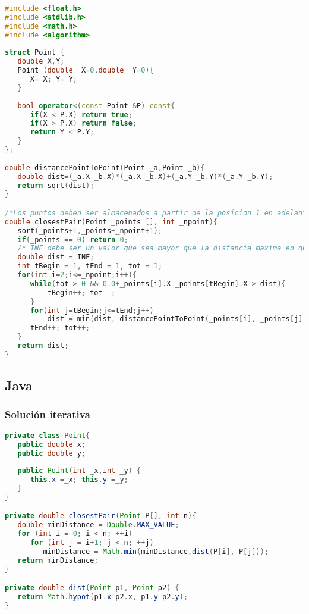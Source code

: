 \begin{lstlisting}[language=C++]
#include <float.h>
#include <stdlib.h>
#include <math.h>
#include <algorithm>
	
struct Point {
   double X,Y;
   Point (double _X=0,double _Y=0){
      X=_X; Y=_Y;
   }
		
   bool operator<(const Point &P) const{
      if(X < P.X) return true;
      if(X > P.X) return false;
      return Y < P.Y;
   }
};
	
double distancePointToPoint(Point _a,Point _b){
   double dist=(_a.X-_b.X)*(_a.X-_b.X)+(_a.Y-_b.Y)*(_a.Y-_b.Y);
   return sqrt(dist);
}

/*Los puntos deben ser almacenados a partir de la posicion 1 en adelante y no en la posicion 0 como de costumbre*/	
double closestPair(Point _points [], int _npoint){
   sort(_points+1,_points+_npoint+1); 
   if(_points == 0) return 0;
   /* INF debe ser un valor que sea mayor que la distancia maxima en que se pueda encontrar dos puntos segun el problema. Si dicen que las coordenadas de los puntos va estar entre -10^9 a 10^9 entonces: INF= distancePointToPoint( Point(-10^9,-10^9),Point(10^9,10^9) )+100 */ 
   double dist = INF;
   int tBegin = 1, tEnd = 1, tot = 1;
   for(int i=2;i<=_npoint;i++){
      while(tot > 0 && 0.0+_points[i].X-_points[tBegin].X > dist){ 
          tBegin++; tot--; 
      }
      for(int j=tBegin;j<=tEnd;j++)
          dist = min(dist, distancePointToPoint(_points[i], _points[j]));
      tEnd++; tot++;
   }
   return dist;
}
\end{lstlisting}

\subsection{Java}

\subsubsection{Solución iterativa}
\begin{lstlisting}[language=Java]
private class Point{
   public double x;
   public double y;
   
   public Point(int _x,int _y) {
      this.x =_x; this.y =_y;
   }
}

private double closestPair(Point P[], int n){
   double minDistance = Double.MAX_VALUE;
   for (int i = 0; i < n; ++i)
      for (int j = i+1; j < n; ++j)
         minDistance = Math.min(minDistance,dist(P[i], P[j]));
   return minDistance;
}

private double dist(Point p1, Point p2) {
   return Math.hypot(p1.x-p2.x, p1.y-p2.y);
}
\end{lstlisting}

